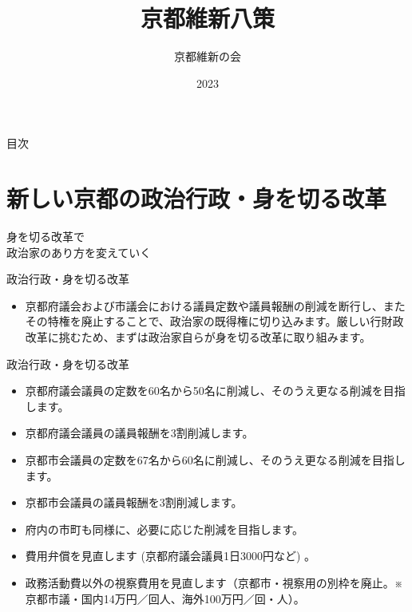 \documentclass[dvipdfmx]{beamer}
\title{京都維新八策}
\subtitle{}
\author{京都維新の会}
\date{2023}
\begin{document}
\maketitle

\begin{frame}{目次}
    \tableofcontents
\end{frame}

\section{新しい京都の政治行政・身を切る改革}
    \begin{frame}{}{}
        \sectionpage
        \begin{center}
            \begin{large}
                \alert{身を切る改革で}\\\alert{政治家のあり方を変えていく}
            \end{large}
        \end{center}
    \end{frame}

    \begin{frame}{政治行政・身を切る改革}{}
        \begin{small}
            \begin{itemize}
                \setlength{\itemsep}{2mm}
                \item 京都府議会および市議会における議員定数や議員報酬の削減を断行し、またその特権を廃止することで、政治家の既得権に切り込みます。厳しい行財政改革に挑むため、まずは政治家自らが身を切る改革に取り組みます。
            \end{itemize}
        \end{small}
    \end{frame}

    \begin{frame}{政治行政・身を切る改革}{}
        \begin{small}
            \begin{itemize}
                \setlength{\itemsep}{2mm}
                \item 京都府議会議員の定数を60名から50名に削減し、そのうえ更なる削減を目指します。
                \item 京都府議会議員の議員報酬を3割削減します。
                \item 京都市会議員の定数を67名から60名に削減し、そのうえ更なる削減を目指します。
                \item 京都市会議員の議員報酬を3割削減します。
                \item 府内の市町も同様に、必要に応じた削減を目指します。
                \item 費用弁償を見直します (京都府議会議員1日3000円など) 。
                \item 政務活動費以外の視察費用を見直します（京都市・視察用の別枠を廃止。※京都市議・国内14万円／回人、海外100万円／回・人）。
            \end{itemize}
        \end{small}
    \end{frame}
\end{document}

